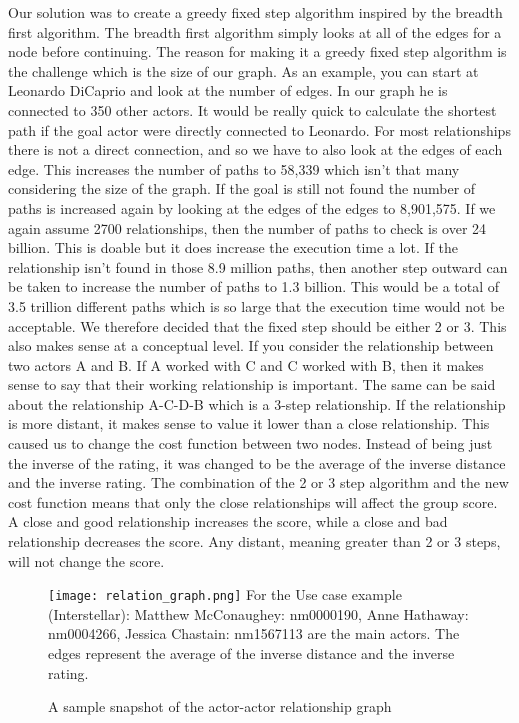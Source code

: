 Our solution was to create a greedy fixed step algorithm inspired by the breadth first algorithm. The breadth first algorithm simply looks at all of the edges for a node before continuing. The reason for making it a greedy fixed step algorithm is the challenge which is the size of our graph. As an example, you can start at Leonardo DiCaprio and look at the number of edges. In our graph he is connected to 350 other actors. It would be really quick to calculate the shortest path if the goal actor were directly connected to Leonardo. For most relationships there is not a direct connection, and so we have to also look at the edges of each edge. This increases the number of paths to 58,339 which isn’t that many considering the size of the graph. If the goal is still not found the number of paths is increased again by looking at the edges of the edges to 8,901,575. If we again assume 2700 relationships, then the number of paths to check is over 24 billion. This is doable but it does increase the execution time a lot. If the relationship isn’t found in those 8.9 million paths, then another step outward can be taken to increase the number of paths to 1.3 billion. This would be a total of 3.5 trillion different paths which is so large that the execution time would not be acceptable. We therefore decided that the fixed step should be either 2 or 3. This also makes sense at a conceptual level. If you consider the relationship between two actors A and B. If A worked with C and C worked with B, then it makes sense to say that their working relationship is important. The same can be said about the relationship A-C-D-B which is a 3-step relationship. If the relationship is more distant, it makes sense to value it lower than a close relationship. This caused us to change the cost function between two nodes. Instead of being just the inverse of the rating, it was changed to be the average of the inverse distance and the inverse rating. The combination of the 2 or 3 step algorithm and the new cost function means that only the close relationships will affect the group score. A close and good relationship increases the score, while a close and bad relationship decreases the score. Any distant, meaning greater than 2 or 3 steps, will not change the score.



\begin{figure}[t]
    \centering
    \texttt{[image: relation\_graph.png]}
    \justifying
    \small
    For the Use case example (Interstellar): Matthew McConaughey: nm0000190, Anne Hathaway: nm0004266, Jessica Chastain: nm1567113 are the main actors. The edges represent the average of the inverse distance and the inverse rating.
    \caption{A sample snapshot of the actor-actor relationship graph}
    \label{fig: relation graph}
\end{figure}



